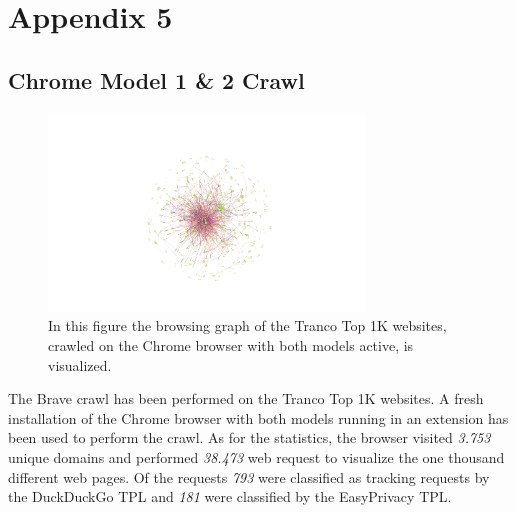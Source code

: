 
\chapter{Appendix 5}
\section{Chrome Model 1 \& 2 Crawl}
\begin{figure}[ht!]
\begin{center}
\includegraphics[width=0.75\textwidth]{images/both.png}
\end{center}
\caption{In this figure the browsing graph of the Tranco Top 1K websites, crawled on the Chrome browser with both models active, is visualized. }
\end{figure}
The Brave crawl has been performed on the Tranco Top 1K websites. A fresh installation of the Chrome browser with both models running in an extension has been used to perform
the crawl. As for the statistics, the browser visited \emph{3.753} unique domains and performed \emph{38.473} web request to 
visualize the one thousand different web pages. Of the requests \emph{793} were classified as tracking requests by the DuckDuckGo 
TPL and \emph{181} were classified by the EasyPrivacy TPL.
